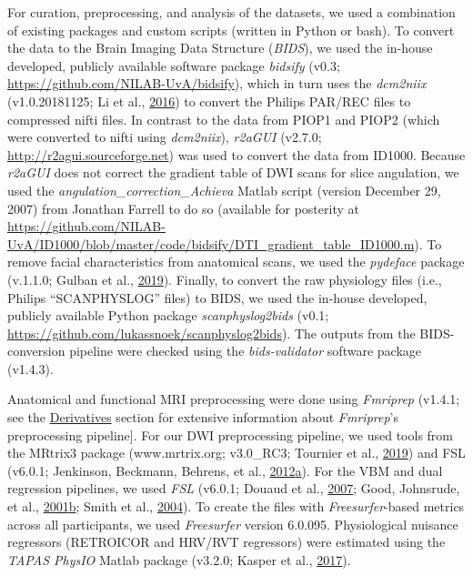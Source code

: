 \documentclass[11pt,american,a4paper,oneside,]{memoir} %
\begin{document}
For curation, preprocessing, and analysis of the datasets, we used a combination of existing packages and custom scripts (written in Python or bash). To convert the data to the Brain Imaging Data Structure (\emph{BIDS}), we used the in-house developed, publicly available software package \emph{bidsify} (v0.3; \url{https://github.com/NILAB-UvA/bidsify}), which in turn uses the \emph{dcm2niix} (v1.0.20181125; Li et al., \protect\hyperlink{ref-Li2016-ss}{2016}) to convert the Philips PAR/REC files to compressed nifti files. In contrast to the data from PIOP1 and PIOP2 (which were converted to nifti using \emph{dcm2niix}), \emph{r2aGUI} (v2.7.0; \url{http://r2agui.sourceforge.net}) was used to convert the data from ID1000. Because \emph{r2aGUI} does not correct the gradient table of DWI scans for slice angulation, we used the \emph{angulation\_correction\_Achieva} Matlab script (version December 29, 2007) from Jonathan Farrell to do so (available for posterity at \url{https://github.com/NILAB-UvA/ID1000/blob/master/code/bidsify/DTI_gradient_table_ID1000.m}). To remove facial characteristics from anatomical scans, we used the \emph{pydeface} package (v.1.1.0; Gulban et al., \protect\hyperlink{ref-Gulban2019-sv}{2019}). Finally, to convert the raw physiology files (i.e., Philips ``SCANPHYSLOG'' files) to BIDS, we used the in-house developed, publicly available Python package \emph{scanphyslog2bids} (v0.1; \url{https://github.com/lukassnoek/scanphyslog2bids}). The outputs from the BIDS-conversion pipeline were checked using the \emph{bids-validator} software package (v1.4.3).

Anatomical and functional MRI preprocessing were done using \emph{Fmriprep} (v1.4.1; see the \protect\hyperlink{aomic-derivatives}{Derivatives} section for extensive information about \emph{Fmriprep}'s preprocessing pipeline{]}. For our DWI preprocessing pipeline, we used tools from the MRtrix3 package (www.mrtrix.org; v3.0\_RC3; Tournier et al., \protect\hyperlink{ref-Tournier2019-hh}{2019}) and FSL (v6.0.1; Jenkinson, Beckmann, Behrens, et al., \protect\hyperlink{ref-Jenkinson2012-ui}{2012}\protect\hyperlink{ref-Jenkinson2012-ui}{a}). For the VBM and dual regression pipelines, we used \emph{FSL} (v6.0.1; Douaud et al., \protect\hyperlink{ref-Douaud2007-sw}{2007}; Good, Johnsrude, et al., \protect\hyperlink{ref-Good2001-kv}{2001}\protect\hyperlink{ref-Good2001-kv}{b}; Smith et al., \protect\hyperlink{ref-Smith2004-sc}{2004}). To create the files with \emph{Freesurfer}-based metrics across all participants, we used \emph{Freesurfer} version 6.0.095. Physiological nuisance regressors (RETROICOR and HRV/RVT regressors) were estimated using the \emph{TAPAS PhysIO} Matlab package (v3.2.0; Kasper et al., \protect\hyperlink{ref-Kasper2017-lp}{2017}).
\end{document}
